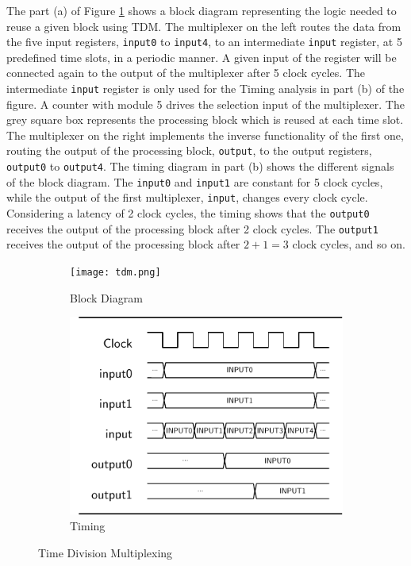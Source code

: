 The part (a) of Figure \ref{fig:time-division-multiplexing} shows a block diagram representing the logic needed to reuse a given block using TDM. The multiplexer on the left routes the data from the five input registers, \verb|input0| to \verb|input4|, to an intermediate \verb|input| register, at 5 predefined time slots, in a periodic manner. A given input of the register will be connected again to the output of the multiplexer after 5 clock cycles. The intermediate \verb|input| register is only used for the Timing analysis in part (b) of the figure. A counter with module 5 drives the selection input of the multiplexer. The grey square box represents the processing block which is reused at each time slot. The multiplexer on the right implements the inverse functionality of the first one, routing the output of the processing block, \verb|output|, to the output registers, \verb|output0| to \verb|output4|. The timing diagram in part (b) shows the different signals of the block diagram. The \verb|input0| and \verb|input1| are constant for 5 clock cycles, while the output of the first multiplexer, \verb|input|, changes every clock cycle. Considering a latency of 2 clock cycles, the timing shows that the \verb|output0| receives the output of the processing block after 2 clock cycles. The \verb|output1| receives the output of the processing block after $2+1=3$ clock cycles, and so on. 

\begin{figure}
    \begin{subfigure}[c]{.5\textwidth}
        \centering
        \texttt{[image: tdm.png]}
        \caption{Block Diagram}
    \end{subfigure}
    \begin{subfigure}[c]{.5\textwidth}
        \centering
        \includegraphics[width=1\linewidth]{../timings/tdm.pdf}
        \caption{Timing}
    \end{subfigure}
    \caption{Time Division Multiplexing}
    \label{fig:time-division-multiplexing}
\end{figure}

